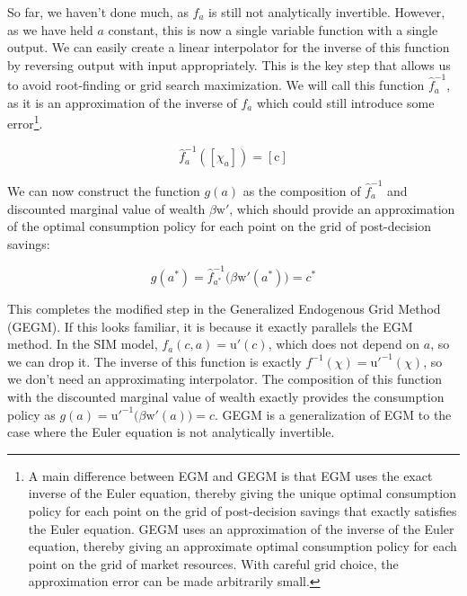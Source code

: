 \documentclass{article}
\newcommand{\DiscFac}{\beta}
\newcommand{\uFunc}{\mathrm{u}}
\newcommand{\aNrm}{a}
\newcommand{\cNrm}{c}
\newcommand{\wFunc}{\mathrm{w}}
\newcommand{\cMat}{[\mathrm{\cNrm}]}
\newcommand{\xFer}{\chi}
\begin{document}
So far, we haven't done much, as $f_a$ is still not analytically invertible. However, as we have held $\aNrm$ constant, this is now a single variable function with a single output. We can easily create a linear interpolator for the inverse of this function by reversing output with input appropriately. This is the key step that allows us to avoid root-finding or grid search maximization. We will call this function $\hat{f}_{a}^{ -1}$, as it is an approximation of the inverse of $f_{a}$ which could still introduce some error\footnote{A main difference between EGM and GEGM is that EGM uses the exact inverse of the Euler equation, thereby giving the unique optimal consumption policy for each point on the grid of post-decision savings that exactly satisfies the Euler equation. GEGM uses an approximation of the inverse of the Euler equation, thereby giving an approximate optimal consumption policy for each point on the grid of market resources. With careful grid choice, the approximation error can be made arbitrarily small.}.

\begin{equation}
\hat{f}_{a}^{-1}([\xFer_{a}]) = \cMat
\end{equation}

We can now construct the function $g(\aNrm)$ as the composition of $\hat{f}_{a}^{ -1}$ and discounted marginal value of wealth $\DiscFac \wFunc'$, which should provide an approximation of the optimal consumption policy for each point on the grid of post-decision savings:

\begin{equation}
g(\aNrm^*) = \hat{f}_{a^*}^{-1} \big( \DiscFac \wFunc'(\aNrm^*) \big) = \cNrm^*
\end{equation}

This completes the modified step in the Generalized Endogenous Grid Method (GEGM). If this looks familiar, it is because it exactly parallels the EGM method. In the SIM model, $f_a(\cNrm,\aNrm) = \uFunc'(\cNrm)$, which does not depend on $\aNrm$, so we can drop it. The inverse of this function is exactly $f^{ -1}(\xFer) = \uFunc'^{ -1}(\xFer)$, so we don't need an approximating interpolator. The composition of this function with the discounted marginal value of wealth exactly provides the consumption policy as $g(\aNrm) = \uFunc'^{ -1} \big( \DiscFac \wFunc'(\aNrm) \big) = \cNrm$. GEGM is a generalization of EGM to the case where the Euler equation is not analytically invertible.
\end{document}

